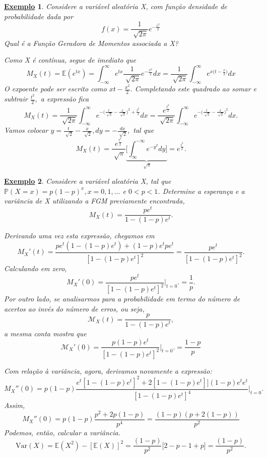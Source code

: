 \documentclass{article}
\newtheorem{example}{\underline{Exemplo}}
\begin{document}
\begin{example}
  Considere a variável aleatória X, com função densidade de probabilidade dada por 
  \[
    f(x) = \frac{1}{\sqrt[]{2\pi }}e^{-\frac{x^{2}}{2}}
  \]
  Qual é a Função Geradora de Momentos associada a X?

  Como X é contínua, segue de imediato que 
  \[
    M_{X}(t) = \mathbb{E}(e^{tx}) = \int_{-\infty}^{\infty}e^{tx}\frac{1}{\sqrt[]{2\pi }}e^{-\frac{x^{2}}{2}}dx = \frac{1}{\sqrt[]{2\pi }}\int_{-\infty}^{\infty}e^{x\bigl(t-\frac{x}{2}\bigr)}dx
  \]
  O expoente pode ser escrito como \(xt - \frac{x^{2}}{2}\). Completando este quadrado ao somar e subtrair \(\frac{t^{2}}{2},\) a expressão fica 
  \[
    M_{X}(t) = \frac{1}{\sqrt[]{2\pi }}\int_{-\infty}^{\infty}e^{-\bigl(\frac{t}{\sqrt[]{2}}-\frac{x}{\sqrt[]{2}}\bigr)^2 + \frac{t^{2}}{2}}dx = \frac{e^{\frac{t^{2}}{2}}}{\sqrt[]{2\pi }}\int_{-\infty}^{\infty}e^{-\bigl(\frac{t}{\sqrt[]{2}}-\frac{x}{\sqrt[]{2}}\bigr)^{2}}dx.
  \]
  Vamos colocar \(y = \frac{t}{\sqrt[]{2}}-\frac{x}{\sqrt[]{2}}, dy = -\frac{dx}{\sqrt[]{2}},\) tal que 
  \[
    M_{X}(t) = \frac{e^{\frac{t^{2}}{2}}}{\sqrt[]{\pi }}\underbrace{\biggl[\int_{\infty}^{-\infty}e^{-y^{2}}dy\biggr]}_{\sqrt[]{\pi }} = e^{\frac{t^{2}}{2}}.
  \]
\end{example}
\begin{example}
  Considere a variável aleatória X, tal que \(\mathbb{P}(X=x) = p(1-p)^{x}, x = 0, 1, \dotsc\) e \(0 < p < 1\).
  Determine a esperança e a variância de X utilizando a FGM previamente encontrada, 
  \[
    M_{X}(t) = \frac{pe^{t}}{1-(1-p)e^{t}}.
  \]

  Derivando uma vez esta expressão, chegamos em 
  \[
    M_{X}'(t) = \frac{pe^{t}(1-(1-p)e^{t}) + (1-p)e^{t}pe^{t}}{[1-(1-p)e^{t}]^{2}} = \frac{pe^{t}}{[1-(1-p)e^{t}]^{2}}.
  \]
  Calculando em zero, 
  \[
    M_{X}'(0) = \frac{pe^{t}}{[1-(1-p)e^{t}]^{2}}\biggl|_{t=0}^{}\biggr. = \frac{1}{p}.
  \] 
  Por outro lado, se analisarmos para a probabilidade em termo do número de acertos ao invés do número de erros, ou seja, 
  \[
    \mathcal{M}_{X}(t) = \frac{p}{1-(1-p)e^{t}},
  \]
  a mesma conta mostra que 
  \[
    \mathcal{M}_{X}'(0) = \frac{p(1-p)e^{t}}{[1-(1-p)e^{t}]^{2}}\biggl|_{t=0}^{}\biggr. = \frac{1-p}{p}
  \]

  Com relação à variância, agora, derivamos novamente a expressão:
  \[
    M_{X}''(0) = p(1-p)\frac{e^{t}[1-(1-p)e^{t}]^{2}+2[1-(1-p)e^{t}]](1-p)e^{t}e^{t}}{[1-(1-p)e^{t}]^{4}}\biggl|_{t=0}^{}\biggr.
  \]
  Assim, 
  \[
    M_{X}''(0) = p(1-p)\frac{p^{2}+2p(1-p)}{p^{4}} = \frac{(1-p)(p+2(1-p))}{p^{2}} 
  \]
  Podemos, então, calcular a variância. 
  \[
    \mathrm{Var}(X) = \mathbb{E}(X^{2}) - [\mathbb{E}(X)]^{2} = \frac{(1-p)}{p^{2}}\biggl[2-p-1+p\biggr] = \frac{(1-p)}{p^{2}}.
  \]
\end{example}
\end{document}
